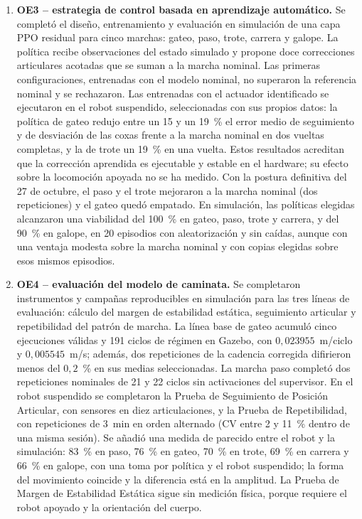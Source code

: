 \begin{enumerate}
\item \textbf{OE3 -- estrategia de control basada en aprendizaje automático.}
Se completó el diseño, entrenamiento y evaluación en simulación de una capa PPO
residual para cinco marchas: gateo, paso, trote, carrera y galope. La política recibe observaciones del estado
simulado y propone doce correcciones articulares acotadas que se suman a la
marcha nominal. Las primeras configuraciones, entrenadas con el modelo nominal,
no superaron la referencia nominal y se rechazaron. Las entrenadas con el
actuador identificado se ejecutaron en el robot suspendido, seleccionadas con
sus propios datos: la política de gateo redujo entre un 15 y un 19~\% el error
medio de seguimiento y de desviación de las coxas frente a la marcha nominal en
dos vueltas completas, y la de trote un 19~\% en una vuelta. Estos resultados
acreditan que la corrección aprendida es ejecutable y estable en el hardware;
su efecto sobre la locomoción apoyada no se ha medido. Con la postura definitiva del 27
de octubre, el paso y el trote mejoraron a la marcha nominal (dos repeticiones) y el
gateo quedó empatado. En simulación, las políticas elegidas alcanzaron una viabilidad del
100~\% en gateo, paso, trote y carrera, y del 90~\% en galope, en 20 episodios con
aleatorización y sin caídas, aunque con una ventaja modesta sobre la marcha nominal y
con copias elegidas sobre esos mismos episodios.

\item \textbf{OE4 -- evaluación del modelo de caminata.}
Se completaron instrumentos y campañas reproducibles en simulación para las
tres líneas de evaluación: cálculo del margen de estabilidad estática,
seguimiento articular y repetibilidad del patrón de marcha. La línea base de
gateo acumuló cinco ejecuciones válidas y 191 ciclos de régimen en Gazebo, con
$0{,}023955$~m/ciclo y $0{,}005545$~m/s; además, dos repeticiones de la
cadencia corregida difirieron menos del $0{,}2$~\% en sus medias seleccionadas.
La marcha paso completó dos repeticiones nominales de 21 y 22 ciclos sin
activaciones del supervisor. En el robot suspendido se completaron la Prueba de Seguimiento
de Posición Articular, con sensores en diez articulaciones, y la Prueba de
Repetibilidad, con repeticiones de 3~min en orden alternado (CV entre 2 y 11~\%
dentro de una misma sesión). Se añadió una medida de parecido entre el robot y la
simulación: 83~\% en paso, 76~\% en gateo, 70~\% en trote, 69~\% en carrera y 66~\% en
galope, con una toma por política
y el robot suspendido; la forma del movimiento coincide y la diferencia está en la
amplitud. La Prueba de Margen de Estabilidad Estática sigue
sin medición física, porque requiere el robot apoyado y la orientación del
cuerpo.
\end{enumerate}

